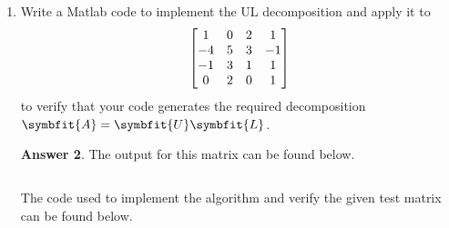 \documentclass{article}
\theoremstyle{definition}
\newtheorem*{answer}{Answer}
\newcommand{\mat}[1]{\symbfit{#1}}
\begin{document}
\begin{enumerate}[leftmargin=\labelsep]
\begin{enumerate}
\begin{answer}
\begin{proof}
\begin{itemize}
\begin{align*}
						                  \hat{\mat{A}} & = \mat{U}_1\mat{L}_1,                                                        \\
						                  \shortintertext{which exist by assumption, we have}
						                  \mat{A}       & = \mqty[\mat{U}_1     & \vec{l} \\\vec{0}^\top & 1]\mqty[\mat{L}_1 & \vec{0} \\\vec{c}^\top&\alpha_{nn}],
					                  \end{align*}
					                  where \(\vec{l} = \vec{a} / \alpha_{nn}\). Note, then that \(0 \neq \det(\mat{A}) = \det(\mat{L}_1) \alpha_{nn}\), so \(\alpha_{nn} \neq 0\), and the lower triangular matrix is nonsingular.
				            \end{itemize}
			            \end{proof}
		            \end{answer}

		      \item Write a Matlab code to implement the UL decomposition and apply it to
		            \[
			            \mqty[1&0&2&1\\-4&5&3&-1\\-1&3&1&1\\0&2&0&1]
		            \]
		            to verify that your code generates the required decomposition \(\mat{A} = \mat{U}\mat{L}\).
		            \begin{answer}
			            The output for this matrix can be found below.
			            \begin{mdframed}[backgroundcolor=lightgray]
				            \setlength{\lineskip}{0pt}
				            \inputminted{text}{out/output5.txt}
			            \end{mdframed}
			            The code used to implement the algorithm and verify the given test matrix can be found below.
			            \begin{mdframed}[backgroundcolor=lightgray]
			            \end{mdframed}
		            \end{answer}
	      \end{enumerate}


\end{enumerate}
\end{document}
